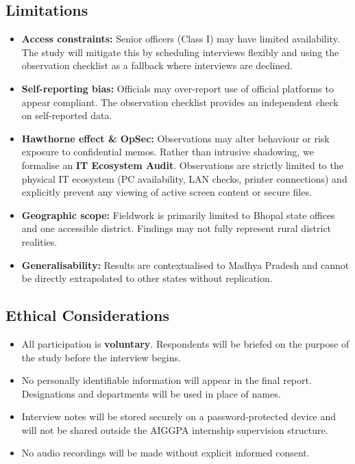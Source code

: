\documentclass[11pt,a4paper]{article}
\begin{document}
\vspace{0.2cm}

\subsection{Limitations}

\begin{itemize}
  \item \textbf{Access constraints:} Senior officers (Class I) may have limited
    availability. The study will mitigate this by scheduling interviews flexibly
    and using the observation checklist as a fallback where interviews are declined.
  \item \textbf{Self-reporting bias:} Officials may over-report use of official
    platforms to appear compliant. The observation checklist provides an independent
    check on self-reported data.
  \item \textbf{Hawthorne effect \& OpSec:} Observations may alter behaviour or risk exposure 
    to confidential memos. Rather than intrusive shadowing, we formalise an \textbf{IT Ecosystem Audit}. 
    Observations are strictly limited to the physical IT ecosystem (PC availability, LAN checks, 
    printer connections) and explicitly prevent any viewing of active screen content or secure files.
  \item \textbf{Geographic scope:} Fieldwork is primarily limited to Bhopal state
    offices and one accessible district. Findings may not fully represent rural
    district realities.
  \item \textbf{Generalisability:} Results are contextualised to Madhya Pradesh and
    cannot be directly extrapolated to other states without replication.
\end{itemize}

\subsection{Ethical Considerations}

\begin{itemize}
  \item All participation is \textbf{voluntary}. Respondents will be briefed on the
    purpose of the study before the interview begins.
  \item No personally identifiable information will appear in the final report.
    Designations and departments will be used in place of names.
  \item Interview notes will be stored securely on a password-protected device and
    will not be shared outside the AIGGPA internship supervision structure.
  \item No audio recordings will be made without explicit informed consent.
\end{itemize}
\end{document}
